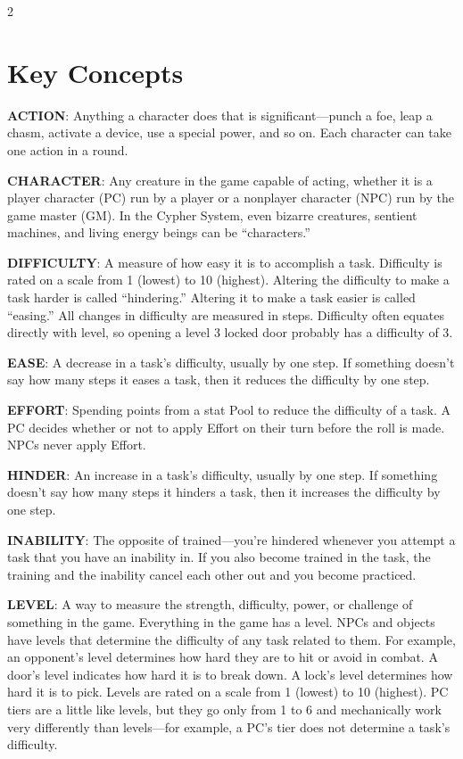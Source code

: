 \begin{multicols}{2}
\section{Key Concepts}

\textbf{ACTION}: Anything a character does that is significant—punch a foe, leap a chasm, activate a device, use a special power, and so on. Each character can take one action in a round.

\textbf{CHARACTER}: Any creature in the game capable of acting, whether it is a player character (PC) run by a player or a nonplayer character (NPC) run by the game master (GM). In the Cypher System, even bizarre creatures, sentient machines, and living energy beings can be “characters.”

\textbf{DIFFICULTY}: A measure of how easy it is to accomplish a task. Difficulty is rated on a scale from 1 (lowest) to 10 (highest). Altering the difficulty to make a task harder is called “hindering.” Altering it to make a task easier is called “easing.” All changes in difficulty are measured in steps. Difficulty often equates directly with level, so opening a level 3 locked door probably has a difficulty of 3.

\textbf{EASE}: A decrease in a task’s difficulty, usually by one step. If something doesn’t say how many steps it eases a task, then it reduces the difficulty by one step.

\textbf{EFFORT}: Spending points from a stat Pool to reduce the difficulty of a task. A PC decides whether or not to apply Effort on their turn before the roll is made. NPCs never apply Effort.

\textbf{HINDER}: An increase in a task’s difficulty, usually by one step. If something doesn’t say how many steps it hinders a task, then it increases the difficulty by one step.

\textbf{INABILITY}: The opposite of trained—you’re hindered whenever you attempt a task that you have an inability in. If you also become trained in the task, the training and the inability cancel each other out and you become practiced.

\textbf{LEVEL}: A way to measure the strength, difficulty, power, or challenge of something in the game. Everything in the game has a level. NPCs and objects have levels that determine the difficulty of any task related to them. For example, an opponent’s level determines how hard they are to hit or avoid in combat. A door’s level indicates how hard it is to break down. A lock’s level determines how hard it is to pick. Levels are rated on a scale from 1 (lowest) to 10 (highest). PC tiers are a little like levels, but they go only from 1 to 6 and mechanically work very differently than levels—for example, a PC’s tier does not determine a task’s difficulty.


\end{multicols}
